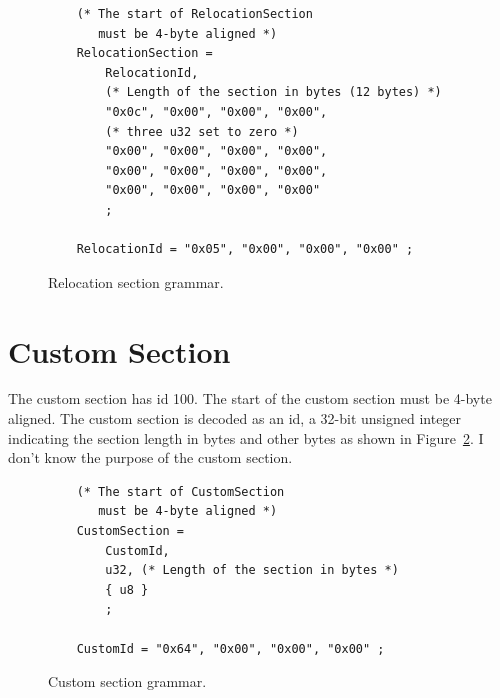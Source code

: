 \documentclass{article}
\begin{document}
\begin{figure}[H]
\begin{verbatim}
    (* The start of RelocationSection
       must be 4-byte aligned *)
    RelocationSection =
        RelocationId,
        (* Length of the section in bytes (12 bytes) *)
        "0x0c", "0x00", "0x00", "0x00",
        (* three u32 set to zero *)
        "0x00", "0x00", "0x00", "0x00",
        "0x00", "0x00", "0x00", "0x00",
        "0x00", "0x00", "0x00", "0x00"
        ;

    RelocationId = "0x05", "0x00", "0x00", "0x00" ;
\end{verbatim}
\caption{Relocation section grammar.}
\label{fig:relocation-section-grammar}
\end{figure}

\section{Custom Section}
The custom section has id 100.
The start of the custom section must be 4-byte aligned.
The custom section is decoded as an id, a 32-bit unsigned integer indicating the section length in bytes and other bytes as shown in Figure~\ref{fig:cusom-section-grammar}.
I don't know the purpose of the custom section.

\begin{figure}[H]
\begin{verbatim}
    (* The start of CustomSection
       must be 4-byte aligned *)
    CustomSection =
        CustomId,
        u32, (* Length of the section in bytes *)
        { u8 }
        ;

    CustomId = "0x64", "0x00", "0x00", "0x00" ;
\end{verbatim}
\caption{Custom section grammar.}
\label{fig:cusom-section-grammar}
\end{figure}
\end{document}
